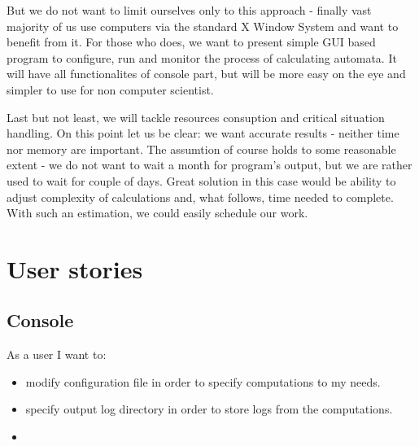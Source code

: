 \documentclass{article}
\begin{document}
But we do not want to limit ourselves only to this approach - finally vast majority of us use computers via the standard X Window System and want to benefit from it. For those who does, we want to present simple GUI based program to configure, run and monitor the process of calculating automata. It will have all functionalites of console part, but will be more easy on the eye and simpler to use for non computer scientist.


Last but not least, we will tackle resources consuption and critical situation handling. On this point let us be clear: we want accurate results - neither time nor memory are important. The assumtion of course holds to some reasonable extent - we do not want to wait a month for program's output, but we are rather used to wait for couple of days. Great solution in this case would be ability to adjust complexity of calculations and, what follows, time needed to complete. With such an estimation, we could easily schedule our work.

\newpage
\section{User stories}

%
%
\subsection{Console}
As a user I want to:
\begin{itemize}
	\item 
		modify configuration file in order to specify computations to my needs.
		
	\item 
		specify output log directory in order to store logs from the computations.
		
	\item 
\end{itemize}

%
%
\end{document}
